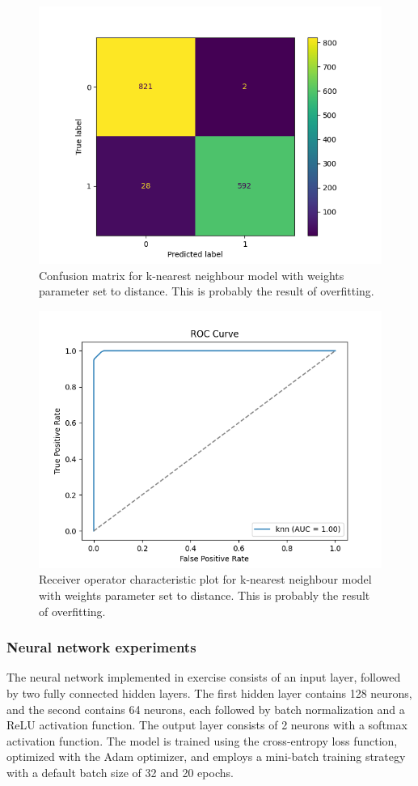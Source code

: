 	\begin{figure}[H]
		\centering
		\includegraphics[width=0.7\linewidth]{img/knn_cm_distance}
		\caption{Confusion matrix for k-nearest neighbour model with weights parameter set to distance. This is probably the result of overfitting.}
		\label{fig:knncmdistance}
	\end{figure}
	
	\begin{figure}[H]
		\centering
		\includegraphics[width=0.7\linewidth]{img/knn_roc_distance}
		\caption{Receiver operator characteristic plot for k-nearest neighbour model with weights parameter set to distance. This is probably the result of overfitting.}
		\label{fig:knnrocdistance}
	\end{figure}
	
	
	\bigskip
	\subsubsection{Neural network experiments}
	
	The neural network implemented in exercise consists of an input layer, followed by two fully connected hidden layers. The first hidden layer contains 128 neurons, and the second contains 64 neurons, each followed by batch normalization and a ReLU activation function. The output layer consists of 2 neurons with a softmax activation function. The model is trained using the cross-entropy loss function, optimized with the Adam optimizer, and employs a mini-batch training strategy with a default batch size of 32 and 20 epochs.
	
